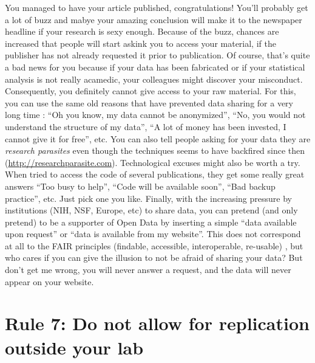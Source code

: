 \documentclass[a4paper,10pt,onecolumn]{article}
\begin{document}
You managed to have your article published, congratulations! You'll probably
get a lot of buzz and mabye your amazing conclusion will make it to the
newspaper headline if your research is sexy enough. Because of the buzz,
chances are increased that people will start askink you to access your
material, if the publisher has not already requested it prior to
publication. Of course, that's quite a bad news for you because if your data
has been fabricated or if your statistical analysis is not really acamedic,
your colleagues might discover your misconduct. Consequently, you definitely
cannot give access to your raw material. For this, you can use the same old
reasons that have prevented data sharing for a very long time
\citep{roche:2014}: ``Oh you know, my data cannot be anonymized'', ``No, you
would not understand the structure of my data'', ``A lot of money has been
invested, I cannot give it for free'', etc. You can also tell people asking for
your data they are {\em research parasites} \citep{longo:2016} even though the
techniques seems to have backfired since then
(\url{http://researchparasite.com}).  Technological excuses might also be worth
a try. When \citep{collberg:2014,collberg:2015} tried to access the code of
several publications, they get some really great answers ``Too busy to help'',
``Code will be available soon'', ``Bad backup practice'', etc. Just pick one
you like. Finally, with the increasing pressure by institutions (NIH, NSF,
Europe, etc) to share data, you can pretend (and only pretend) to be a
supporter of Open Data by inserting a simple ``data available upon request'' or
``data is available from my website''. This does not correspond at all to the
FAIR principles (findable, accessible, interoperable, re-usable)
\citep{wilkinson:2016}, but who cares if you can give the illusion to not be
afraid of sharing your data? But don't get me wrong, you will never answer a
request, and the data will never appear on your website.

\section*{Rule 7: Do not allow for replication outside your lab}
\end{document}
